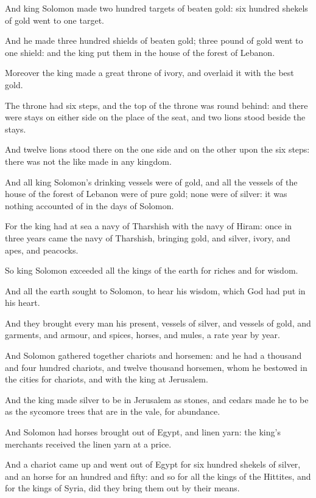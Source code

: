 \verse And king Solomon made two hundred targets of beaten gold: six hundred shekels of gold went to one target.

\verse And he made three hundred shields of beaten gold; three pound of gold went to one shield: and the king put them in the house of the forest of Lebanon.

\verse Moreover the king made a great throne of ivory, and overlaid it with the best gold.

\verse The throne had six steps, and the top of the throne was round behind: and there were stays on either side on the place of the seat, and two lions stood beside the stays.

\verse And twelve lions stood there on the one side and on the other upon the six steps: there was not the like made in any kingdom.

\verse And all king Solomon's drinking vessels were of gold, and all the vessels of the house of the forest of Lebanon were of pure gold; none were of silver: it was nothing accounted of in the days of Solomon.

\verse For the king had at sea a navy of Tharshish with the navy of Hiram: once in three years came the navy of Tharshish, bringing gold, and silver, ivory, and apes, and peacocks.

\verse So king Solomon exceeded all the kings of the earth for riches and for wisdom.

\verse And all the earth sought to Solomon, to hear his wisdom, which God had put in his heart.

\verse And they brought every man his present, vessels of silver, and vessels of gold, and garments, and armour, and spices, horses, and mules, a rate year by year.

\verse And Solomon gathered together chariots and horsemen: and he had a thousand and four hundred chariots, and twelve thousand horsemen, whom he bestowed in the cities for chariots, and with the king at Jerusalem.

\verse And the king made silver to be in Jerusalem as stones, and cedars made he to be as the sycomore trees that are in the vale, for abundance.

\verse And Solomon had horses brought out of Egypt, and linen yarn: the king's merchants received the linen yarn at a price.

\verse And a chariot came up and went out of Egypt for six hundred shekels of silver, and an horse for an hundred and fifty: and so for all the kings of the Hittites, and for the kings of Syria, did they bring them out by their means.


